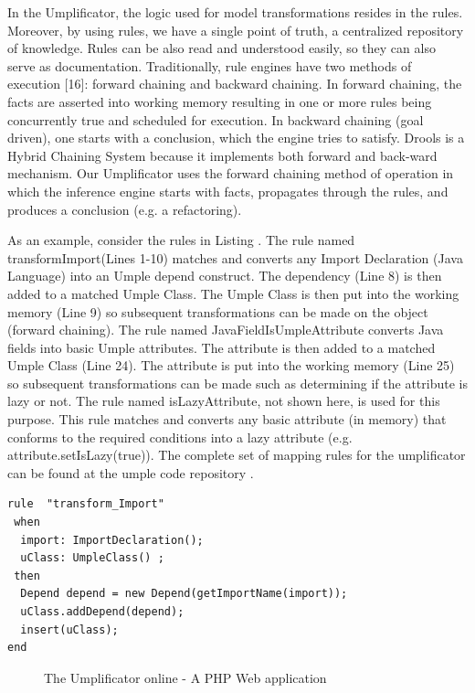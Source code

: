 In the Umplificator, the logic used for model transformations resides in the rules. Moreover, by using rules, we have a single point of truth, a centralized repository of knowledge. Rules can be also read and understood easily, so they can also serve as documentation.
Traditionally, rule engines have two methods of execution [16]: forward chaining and backward chaining. In forward chaining, the facts are asserted into working memory resulting in one or more rules being concurrently true and scheduled for execution. In backward chaining (goal driven), one starts with a conclusion, which the engine tries to satisfy. Drools is a Hybrid Chaining System because it implements both forward and back-ward mechanism. Our Umplificator uses the forward chaining method of operation in which the inference engine starts with facts, propagates through the rules, and produces a conclusion (e.g. a refactoring).  


As an example, consider the rules in Listing . The rule named transformImport(Lines 1-10) matches and converts any Import Declaration (Java Language) into an Umple depend construct. The dependency (Line 8) is then added to a matched Umple Class. The Umple Class is then put into the working memory (Line 9) so subsequent transformations can be made on the object (forward chaining). The rule named JavaFieldIsUmpleAttribute converts Java fields into basic Umple attributes. The attribute is then added to a matched Umple Class (Line 24). The attribute is put into the working memory (Line 25) so subsequent transformations can be made such as determining if the attribute is lazy or not. The rule named isLazyAttribute, not shown here, is used for this purpose. This rule matches and converts any basic attribute (in memory) that conforms to the required conditions into a lazy attribute (e.g. attribute.setIsLazy(true)). The complete set of mapping rules for the umplificator can be found at the umple code repository \cite{MappingRules_Repository}.

\begin{lstlisting}[language={drools},label={lst:rule_import}, caption=Initial Refactoring Mapping Rules]
 rule  "transform_Import"
 when
  import: ImportDeclaration();
  uClass: UmpleClass() ;
 then
  Depend depend = new Depend(getImportName(import));
  uClass.addDepend(depend);
  insert(uClass);
end
\end{lstlisting}


\begin{figure}[h]
\centering
{}
\caption{The Umplificator online - A PHP Web application}
\label{fig:architecture}
\end{figure}


